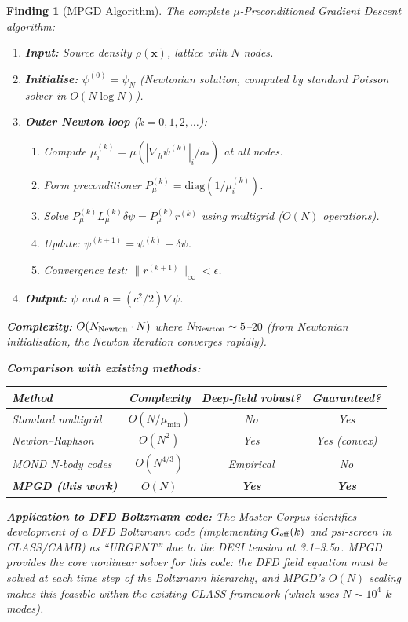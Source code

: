 \documentclass[11pt]{article}
\newtheorem{finding}[theorem]{Finding}
\theoremstyle{definition}
\theoremstyle{remark}
\begin{document}
\begin{finding}[MPGD Algorithm]
\label{find:mpgd-algorithm}
The complete $\mu$-Preconditioned Gradient Descent algorithm:

\begin{enumerate}
\item \textbf{Input:} Source density $\rho(\mathbf{x})$, lattice with $N$ nodes.
\item \textbf{Initialise:} $\psi^{(0)} = \psi_N$ (Newtonian solution, computed
  by standard Poisson solver in $O(N \log N)$).
\item \textbf{Outer Newton loop} ($k = 0, 1, 2, \ldots$):
  \begin{enumerate}
  \item Compute $\mu_i^{(k)} = \mu(|\nabla_h\psi^{(k)}|_i/a_*)$ at all nodes.
  \item Form preconditioner $P_\mu^{(k)} = \text{diag}(1/\mu_i^{(k)})$.
  \item Solve $P_\mu^{(k)} L_\mu^{(k)} \delta\psi = P_\mu^{(k)} r^{(k)}$
    using multigrid ($O(N)$ operations).
  \item Update: $\psi^{(k+1)} = \psi^{(k)} + \delta\psi$.
  \item Convergence test: $\|r^{(k+1)}\|_\infty < \epsilon$.
  \end{enumerate}
\item \textbf{Output:} $\psi$ and $\mathbf{a} = (c^2/2)\nabla\psi$.
\end{enumerate}

\textbf{Complexity:} $O(N_{\rm Newton} \cdot N)$ where $N_{\rm Newton} \sim 5$--$20$
(from Newtonian initialisation, the Newton iteration converges rapidly).

\textbf{Comparison with existing methods:}
\begin{center}
\begin{tabular}{@{}lccc@{}}
\toprule
\textbf{Method} & \textbf{Complexity} & \textbf{Deep-field robust?} & \textbf{Guaranteed?} \\
\midrule
Standard multigrid & $O(N/\mu_{\min})$ & No & Yes \\
Newton--Raphson & $O(N^2)$ & Yes & Yes (convex) \\
MOND N-body codes & $O(N^{4/3})$ & Empirical & No \\
\textbf{MPGD (this work)} & $O(N)$ & \textbf{Yes} & \textbf{Yes} \\
\bottomrule
\end{tabular}
\end{center}

\textbf{Application to DFD Boltzmann code:} The Master Corpus identifies
development of a DFD Boltzmann code (implementing $G_{\rm eff}(k)$ and
psi-screen in CLASS/CAMB) as ``URGENT'' due to the DESI tension at
3.1--3.5$\sigma$. MPGD provides the core nonlinear solver for this code:
the DFD field equation must be solved at each time step of the Boltzmann
hierarchy, and MPGD's $O(N)$ scaling makes this feasible within the
existing CLASS framework (which uses $N \sim 10^4$ $k$-modes).
\end{finding}
\end{document}
